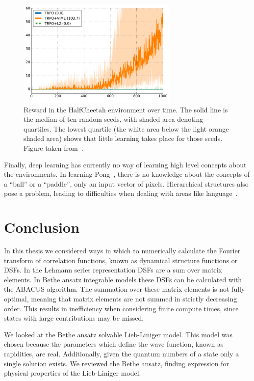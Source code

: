 \documentclass[11pt, a4paper]{report} %
\begin{document}
\begin{figure}[tb!]
  \centering
  \includegraphics[width=0.7\textwidth]{rllearningtrouble.png}
  \caption{Reward in the HalfCheetah environment over time. The solid line is the median of ten random seeds, with shaded area denoting quartiles. The lowest quartile (the white area below the light orange shaded area) shows that little learning takes place for those seeds. Figure taken from~\cite{houthooft16_vime}.}\label{fig:halfcheetah}
\end{figure}



Finally, deep learning has currently no way of learning high level concepts about the environments.
In learning Pong~\cite{mnih13_playin_atari_with_deep_reinf_learn,mnih15_human_level_contr_throug_deep_reinf_learn}, there is no knowledge about the concepts of a ``ball'' or a ``paddle'', only an input vector of pixels.
Hierarchical structures also pose a problem, leading to difficulties when dealing with areas like language~\cite{marcus18_deep_learn}. 


\section{Conclusion}

In this thesis we considered ways in which to numerically calculate the Fourier transform of correlation functions, known as dynamical structure functions or DSFs.
In the Lehmann series representation DSFs are a sum over matrix elements.
In Bethe ansatz integrable models these DSFs can be calculated with the ABACUS algorithm.
The summation over these matrix elements is not fully optimal, meaning that matrix elements are not summed in strictly decreasing order.
This results in inefficiency when considering finite compute times, since states with large contributions may be missed.

We looked at the Bethe ansatz solvable Lieb-Liniger model.
This model was chosen because the parameters which define the wave function, known as rapidities, are real.
Additionally, given the quantum numbers of a state only a single solution exists.
We reviewed the Bethe ansatz, finding expression for physical properties of the Lieb-Liniger model.
\end{document}
